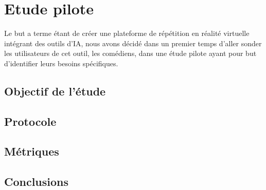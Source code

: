 \section{Etude pilote}

Le but a terme étant de créer une plateforme de répétition en réalité virtuelle intégrant des outils d'IA, nous avons décidé dans un premier temps d'aller sonder les utilisateurs de cet outil, les comédiens, dans une étude pilote ayant pour but d'identifier leurs besoins spécifiques. 

\subsection{Objectif de l'étude}

\subsection{Protocole}

\subsection{Métriques}

\subsection{Conclusions}



